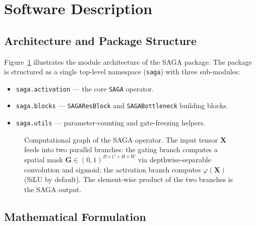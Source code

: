 \documentclass[preprint,12pt]{elsarticle}
\begin{document}
\section{Software Description}
\label{sec:software}

\subsection{Architecture and Package Structure}

Figure~\ref{fig:arch} illustrates the module architecture of the SAGA package.
The package is structured as a single top-level namespace (\texttt{saga})
with three sub-modules:

\begin{itemize}
  \item \texttt{saga.activation} — the core \texttt{SAGA} operator.
  \item \texttt{saga.blocks} — \texttt{SAGAResBlock} and
        \texttt{SAGABottleneck} building blocks.
  \item \texttt{saga.utils} — parameter-counting and gate-freezing helpers.
\end{itemize}

\begin{figure}[t]
  \centering
  \caption{Computational graph of the SAGA operator.
           The input tensor $\mathbf{X}$ feeds into two parallel branches:
           the gating branch computes a spatial mask
           $\mathbf{G} \in (0,1)^{B \times C \times H \times W}$ via
           depthwise-separable convolution and sigmoid;
           the activation branch computes $\varphi(\mathbf{X})$ (SiLU by default).
           The element-wise product of the two branches is the SAGA output.}
  \label{fig:arch}
\end{figure}

\subsection{Mathematical Formulation}
\end{document}
